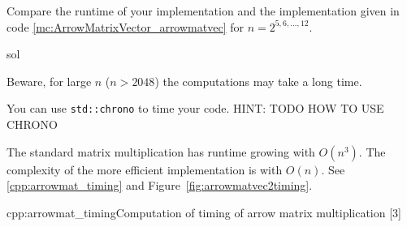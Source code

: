\begin{samproblem}

\begin{subproblem}{}
  Compare the runtime of your implementation and the implementation given in code
  \ref{mc:ArrowMatrixVector_arrowmatvec} for $n=2^{5,6,\ldots,12}$.
 \begin{samwriteprbpart}{sol}
 \begin{samhint}
Beware, for large $n$ ($n > 2048$) the computations may take a long time.
\end{samhint}
 \begin{samhint}
  You can use \texttt{std::chrono} to time your code. HINT: TODO HOW TO USE CHRONO
 \end{samhint}
\begin{samsolution}
The standard matrix multiplication has runtime growing with $O(n^3)$.
The complexity of the more efficient implementation is with $O(n)$.
See \autoref{cpp:arrowmat_timing} and Figure~\ref{fig:arrowmatvec2timing}.

\begin{samcode}[C++11-code]{cpp:arrowmat_timing}{Computation of timing of arrow matrix multiplication}
[3]
\end{samcode}

\begin{figure}
\end{figure}

\end{samsolution}
\end{samwriteprbpart}
\end{subproblem}

\end{samproblem}

